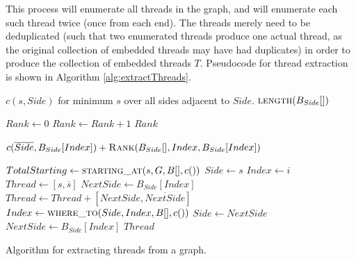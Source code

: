 This process will enumerate all threads in the graph, and will enumerate each such thread twice (once from each end). The threads merely need to be deduplicated (such that two enumerated threads produce one actual thread, as the original collection of embedded threads may have had duplicates) in order to produce the collection of embedded threads $T$. Pseudocode for thread extraction is shown in Algorithm \ref{alg:extractThreads}.

\begin{algorithm}[H]
\begin{algorithmic}
	\State {}
    \State {}
    	\State \Return $c(s, Side)$ for minimum $s$ over all sides adjacent to $Side$.
    \Else
    	\State \Return $\Call{length}{B_{Side}[]}$
    \EndIf
\EndFunction

  \State {}
  \State {}
  \State $Rank \gets 0$
      \State $Rank \gets Rank + 1$
    \EndIf
  \EndFor
  \State \Return $Rank$
\EndFunction

\State {}
\State \Return $c(\overline{Side}, B_{Side}[Index]) + \Call{Rank}{B_{Side}[], Index, B_{Side}[Index]}$
\EndFunction

  \State {}
  	\State $TotalStarting \gets \Call{starting\_at}{s, G, B[], c()}$ %
    \ForAll{$i$ in $[0, TotalStarting)$}
    	\State $Side \gets s$
        \State $Index \gets i$
    	\State $Thread \gets [s, \overline{s}]$
        \State $NextSide \gets B_{Side}[Index]$
          \State $Thread \gets Thread + [NextSide, \overline{NextSide}]$
          \State $Index \gets \Call{where\_to}{Side, Index, B[], c()}$
          \State $Side \gets NextSide$
          \State $NextSide \gets B_{Side}[Index]$
        \EndWhile
        \State \Yield $Thread$
    \EndFor
  \EndFor
\EndFunction
\end{algorithmic}
\caption{Algorithm for extracting threads from a graph.}
\label{alg:extractThreads}
\end{algorithm}



